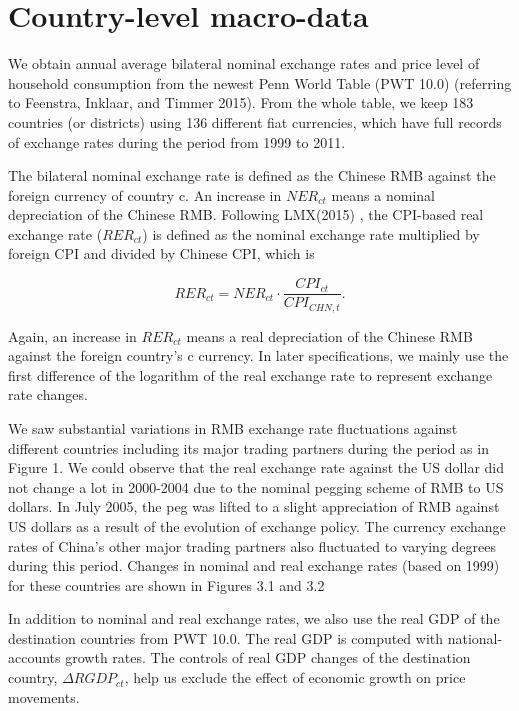 \section{Country-level macro-data}

We obtain annual average bilateral nominal exchange rates and price level of household consumption from the newest Penn World Table (PWT 10.0) (referring to Feenstra, Inklaar, and Timmer 2015\cite{feenstra2015}). From the whole table, we keep 183 countries (or districts) using 136 different fiat currencies, which have full records of exchange rates during the period from 1999 to 2011. 

The bilateral nominal exchange rate is defined as the Chinese RMB against the foreign currency of country c. An increase in $NER_{ct}$ means a nominal depreciation of the Chinese RMB. Following LMX(2015)
\cite{lmx2015}, the CPI-based real exchange rate ($RER_{ct}$) is defined as the nominal exchange rate multiplied by foreign CPI and divided by Chinese CPI, which is

$$
RER_{ct}=NER_{ct} \cdot \frac{CPI_{ct}}{CPI_{CHN,t}}.
$$

Again, an increase in $RER_{ct}$ means a real depreciation of the Chinese RMB against the foreign country's c currency. In later specifications, we mainly use the first difference of the logarithm of the real exchange rate to represent exchange rate changes.

We saw substantial variations in RMB exchange rate fluctuations against different countries including its major trading partners during the period as in Figure 1.  We could observe that the real exchange rate against the US dollar did not change a lot in 2000-2004 due to the nominal pegging scheme of RMB to US dollars. In July 2005, the peg was lifted to a slight appreciation of RMB against US dollars as a result of the evolution of exchange policy. The currency exchange rates of China's other major trading partners also fluctuated to varying degrees during this period. Changes in nominal and real exchange rates (based on 1999) for these countries are shown in Figures 3.1 and 3.2

In addition to nominal and real exchange rates, we also use the real GDP of the destination countries from PWT 10.0. The real GDP is computed with national-accounts growth rates. The controls of real GDP changes of the destination country, $\Delta RGDP_{ct}$, help us exclude the effect of economic growth on price movements.

